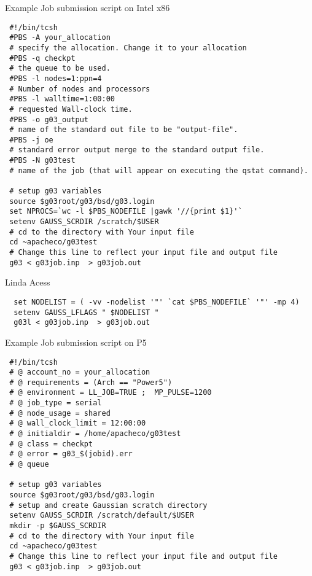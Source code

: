 \documentclass[slidestop,mathserif,compress,xcolor=svgnames]{beamer}
\begin{document}
\begin{frame}[fragile]
\tiny{
\begin{exampleblock}{Example Job submission script on Intel x86}
{\color{white}
\begin{verbatim}
 #!/bin/tcsh
 #PBS -A your_allocation
 # specify the allocation. Change it to your allocation
 #PBS -q checkpt
 # the queue to be used. 
 #PBS -l nodes=1:ppn=4
 # Number of nodes and processors
 #PBS -l walltime=1:00:00
 # requested Wall-clock time.
 #PBS -o g03_output 
 # name of the standard out file to be "output-file".
 #PBS -j oe 
 # standard error output merge to the standard output file.
 #PBS -N g03test 
 # name of the job (that will appear on executing the qstat command).
 
 # setup g03 variables
 source $g03root/g03/bsd/g03.login
 set NPROCS=`wc -l $PBS_NODEFILE |gawk '//{print $1}'`
 setenv GAUSS_SCRDIR /scratch/$USER
 # cd to the directory with Your input file
 cd ~apacheco/g03test 
 # Change this line to reflect your input file and output file
 g03 < g03job.inp  > g03job.out
\end{verbatim}
}
\end{exampleblock}
\begin{alertblock}{Linda Acess}
\begin{verbatim}
  set NODELIST = ( -vv -nodelist '"' `cat $PBS_NODEFILE` '"' -mp 4)
  setenv GAUSS_LFLAGS " $NODELIST "
  g03l < g03job.inp  > g03job.out
\end{verbatim}
\end{alertblock}
}
\end{frame}

\begin{frame}[fragile]
\tiny{
\begin{exampleblock}{Example Job submission script on P5}
{\color{white}
\begin{verbatim}
 #!/bin/tcsh
 # @ account_no = your_allocation
 # @ requirements = (Arch == "Power5")
 # @ environment = LL_JOB=TRUE ;  MP_PULSE=1200
 # @ job_type = serial
 # @ node_usage = shared
 # @ wall_clock_limit = 12:00:00
 # @ initialdir = /home/apacheco/g03test
 # @ class = checkpt
 # @ error = g03_$(jobid).err
 # @ queue

 # setup g03 variables
 source $g03root/g03/bsd/g03.login
 # setup and create Gaussian scratch directory
 setenv GAUSS_SCRDIR /scratch/default/$USER
 mkdir -p $GAUSS_SCRDIR
 # cd to the directory with Your input file
 cd ~apacheco/g03test
 # Change this line to reflect your input file and output file
 g03 < g03job.inp  > g03job.out
\end{verbatim}
}
\end{exampleblock}
}
\end{frame}
\end{document}
